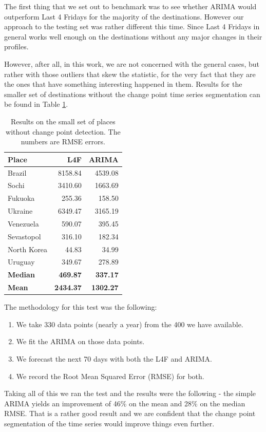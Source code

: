 \documentclass[minf,twoside,singlespacing,parskip,notimes,deptreport]{infthesis} %
\begin{document}
The first thing that we set out to benchmark was to see whether ARIMA would outperform Last 4 Fridays for the majority of the  destinations. However our approach to the testing set was rather different this time. Since Last 4 Fridays in general works well enough on the destinations without any major changes in their profiles.

However, after all, in this work, we are not concerned with the general cases, but rather with those outliers that skew the statistic, for the very fact that they are the ones that have something interesting happened in them. Results for the smaller set of destinations without the change point time series segmentation can be found in Table \ref{comparison-results-v1}. 

\begin{table}[h!]
\begin{center}
\begin{tabular}{ l | r  | r}
Place & L4F & ARIMA\\
\hline
Brazil & 8158.84 & 4539.08\\
Sochi & 3410.60 & 1663.69\\
Fukuoka & 255.36 & 158.50\\
Ukraine & 6349.47 & 3165.19\\
Venezuela & 590.07 & 395.45\\
Sevastopol & 316.10 & 182.34\\
North Korea & 44.83 & 34.99\\
Uruguay & 349.67 & 278.89\\
\hline
\textbf{Median} & \textbf{469.87} & \textbf{337.17} \\
\hline
\textbf{Mean} & \textbf{2434.37} & \textbf{1302.27}\\
\end{tabular}
\end{center}
\caption{Results on the small set of places without change point detection. The numbers are RMSE errors.}
\label{comparison-results-v1}
\end{table}

The methodology for this test was the following:
\begin{enumerate}
\item We take 330 data points (nearly a year) from the 400 we have available. 
\item We fit the ARIMA on those data points. 
\item We forecast the next 70 days with both the L4F and ARIMA.
\item We record the Root Mean Squared Error (RMSE) for both. 
\end{enumerate}
Taking all of this we ran the test and the results were the following - the simple ARIMA yields an improvement of 46\% on the mean and 28\% on the median RMSE. That is a rather good result and we are confident that the change point segmentation of the time series would improve things even further. 
\end{document}
